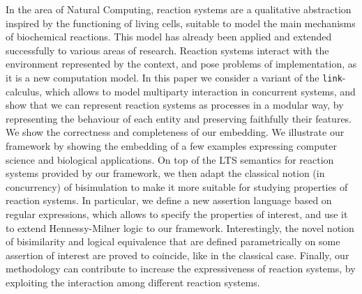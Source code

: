 
In the area of Natural Computing, reaction systems are
a qualitative abstraction inspired by the 
functioning of living cells, suitable to model the main
mechanisms of biochemical reactions.
This model has already been applied
and extended successfully to various areas of research. Reaction 
systems interact with the environment represented by the context, and
pose problems of implementation, as it is a new computation model. 
In this paper we consider a variant of the {\tt link}-calculus, which allows to model 
multiparty interaction in concurrent systems, and show that we can
represent reaction systems as processes 
in a modular way, by representing the behaviour of each entity and
preserving faithfully their features. 
We show the correctness and completeness 
of our embedding.
We illustrate our framework by showing the embedding of 
a few examples expressing computer science
and biological applications.
On top of the LTS semantics for reaction systems provided by our framework, 
we then adapt the classical notion (in concurrency) of bisimulation
to make it more suitable for studying properties of reaction systems.
In particular, we define a new assertion language based on regular expressions, 
which allows to specify the properties of interest, and use it to extend Hennessy-Milner logic
to our framework. Interestingly, the novel notion of bisimilarity and logical equivalence that are defined parametrically on some assertion of interest are proved to coincide, like in the classical case.
Finally, our methodology can contribute to increase the expressiveness
of reaction systems, by exploiting the interaction among 
different reaction systems.
